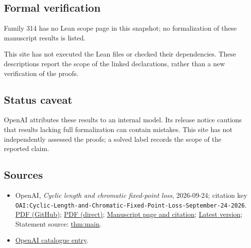 \documentclass[11pt]{article}
\begin{document}
\subsection{Formal verification}
Family 314 has no Lean scope page in this snapshot; no formalization of these manuscript results is listed.

This site has not executed the Lean files or checked their dependencies. These descriptions report the scope of the linked declarations, rather than a new verification of the proofs.

\subsection{Status caveat}
OpenAI attributes these results to an internal model. Its release notice cautions that results lacking full formalization can contain mistakes. This site has not independently assessed the proofs; a solved label records the scope of the reported claim.

\subsection{Sources}
\begin{itemize}
\item OpenAI, \emph{Cyclic length and chromatic fixed-point loss}, 2026-09-24; citation key \texttt{OAI:Cyclic-Length-and-Chromatic-Fixed-Point-Loss-September-24-2026}. \href{https://github.com/openai/math/blob/adc7f1241b42e322a6451854ab7e4b4c146bf78a/preprints/Cyclic-Length-and-Chromatic-Fixed-Point-Loss-September-24-2026/Cyclic-Length-and-Chromatic-Fixed-Point-Loss-September-24-2026.pdf}{PDF (GitHub)}; \href{https://github.com/openai/math/raw/adc7f1241b42e322a6451854ab7e4b4c146bf78a/preprints/Cyclic-Length-and-Chromatic-Fixed-Point-Loss-September-24-2026/Cyclic-Length-and-Chromatic-Fixed-Point-Loss-September-24-2026.pdf}{PDF (direct)}; \href{https://github.com/openai/math/blob/adc7f1241b42e322a6451854ab7e4b4c146bf78a/preprints/Cyclic-Length-and-Chromatic-Fixed-Point-Loss-September-24-2026/README.md}{Manuscript page and citation}; \href{https://github.com/openai/math/blob/main/preprints/Cyclic-Length-and-Chromatic-Fixed-Point-Loss-September-24-2026/Cyclic-Length-and-Chromatic-Fixed-Point-Loss-September-24-2026.pdf}{Latest version}; Statement source: \href{https://github.com/openai/math/blob/adc7f1241b42e322a6451854ab7e4b4c146bf78a/preprints/Cyclic-Length-and-Chromatic-Fixed-Point-Loss-September-24-2026/build/sections/01-introduction.tex\#L18}{thm:main}.
\item \href{https://github.com/openai/math/blob/adc7f1241b42e322a6451854ab7e4b4c146bf78a/CONTENTS.md}{OpenAI catalogue entry}.
\end{itemize}
\end{document}
